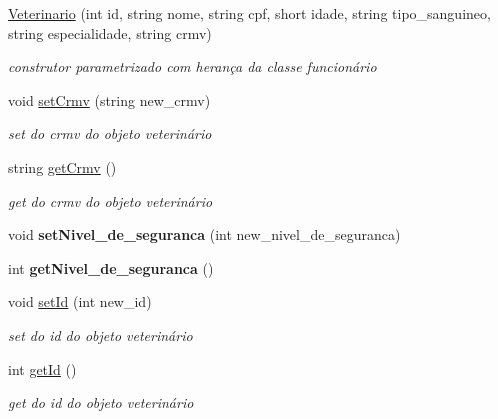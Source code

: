 \begin{DoxyCompactItemize}
\item 
\mbox{\label{class_veterinario_a062307314c78c00b8fbf42f3e2d5185a}} 
\mbox{\hyperlink{class_veterinario_a062307314c78c00b8fbf42f3e2d5185a}{Veterinario}} (int id, string nome, string cpf, short idade, string tipo\+\_\+sanguineo, string especialidade, string crmv)
\begin{DoxyCompactList}\small\item\em construtor parametrizado com herança da classe funcionário \end{DoxyCompactList}\item 
void \mbox{\hyperlink{class_veterinario_a01df797952ad2f6ddafdbd8d1e19c100}{set\+Crmv}} (string new\+\_\+crmv)
\begin{DoxyCompactList}\small\item\em set do crmv do objeto veterinário \end{DoxyCompactList}\item 
string \mbox{\hyperlink{class_veterinario_ad2db954882b1bb854e5da0a5e09e77b5}{get\+Crmv}} ()
\begin{DoxyCompactList}\small\item\em get do crmv do objeto veterinário \end{DoxyCompactList}\item 
\mbox{\label{class_veterinario_a13314123960e75acfbc34a7fec595224}} 
void {\bfseries set\+Nivel\+\_\+de\+\_\+seguranca} (int new\+\_\+nivel\+\_\+de\+\_\+seguranca)
\item 
\mbox{\label{class_veterinario_a18077332e3f0dc3ab0ab7a172691c132}} 
int {\bfseries get\+Nivel\+\_\+de\+\_\+seguranca} ()
\item 
void \mbox{\hyperlink{class_veterinario_a34e49acb7ff51961d3291ddf7a736a08}{set\+Id}} (int new\+\_\+id)
\begin{DoxyCompactList}\small\item\em set do id do objeto veterinário \end{DoxyCompactList}\item 
int \mbox{\hyperlink{class_veterinario_a05a384c00f24f3631150e7499834eeef}{get\+Id}} ()
\begin{DoxyCompactList}\small\item\em get do id do objeto veterinário \end{DoxyCompactList}\item 

\end{DoxyCompactItemize}
